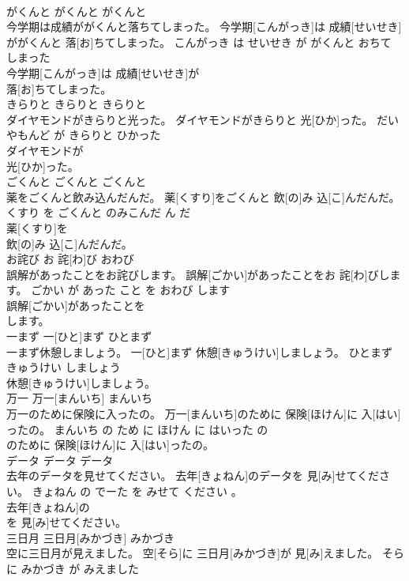 \documentclass[8pt]{extreport}
\begin{document}
\begin{CJK}{UTF8}{min}
\\	がくんと	がくんと	がくんと	
\\	今学期は成績ががくんと落ちてしまった。	今学期[こんがっき]は 成績[せいせき]ががくんと 落[お]ちてしまった。	こんがっき は せいせき が がくんと おちて しまった	
\\	今学期[こんがっき]は 成績[せいせき]が
\\	落[お]ちてしまった。			
\\	きらりと	きらりと	きらりと	
\\	ダイヤモンドがきらりと光った。	ダイヤモンドがきらりと 光[ひか]った。	だいやもんど が きらりと ひかった	
\\	ダイヤモンドが
\\	光[ひか]った。			
\\	ごくんと	ごくんと	ごくんと	
\\	薬をごくんと飲み込んだんだ。	薬[くすり]をごくんと 飲[の]み 込[こ]んだんだ。	くすり を ごくんと のみこんだ ん だ	
\\	薬[くすり]を
\\	飲[の]み 込[こ]んだんだ。			
\\	お詫び	お 詫[わ]び	おわび	
\\	誤解があったことをお詫びします。	誤解[ごかい]があったことをお 詫[わ]びします。	ごかい が あった こと を おわび します	
\\	誤解[ごかい]があったことを
\\	します。			
\\	一まず	一[ひと]まず	ひとまず	
\\	一まず休憩しましょう。	一[ひと]まず 休憩[きゅうけい]しましょう。	ひとまず きゅうけい しましょう	
\\	休憩[きゅうけい]しましょう。			
\\	万一	万一[まんいち]	まんいち	
\\	万一のために保険に入ったの。	万一[まんいち]のために 保険[ほけん]に 入[はい]ったの。	まんいち の ため に ほけん に はいった の	
\\	のために 保険[ほけん]に 入[はい]ったの。			
\\	データ	データ	データ	
\\	去年のデータを見せてください。	去年[きょねん]のデータを 見[み]せてください。	きょねん の でーた を みせて ください 。	
\\	去年[きょねん]の
\\	を 見[み]せてください。			
\\	三日月	三日月[みかづき]	みかづき	
\\	空に三日月が見えました。	空[そら]に 三日月[みかづき]が 見[み]えました。	そら に みかづき が みえました	

\end{CJK}
\end{document}
